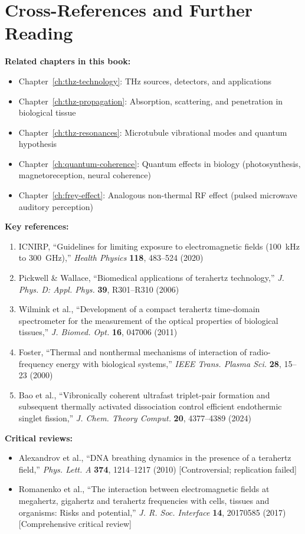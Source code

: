 \section{Cross-References and Further Reading}

\textbf{Related chapters in this book:}
\begin{itemize}
\item Chapter~\ref{ch:thz-technology}: THz sources, detectors, and applications
\item Chapter~\ref{ch:thz-propagation}: Absorption, scattering, and penetration in biological tissue
\item Chapter~\ref{ch:thz-resonances}: Microtubule vibrational modes and quantum hypothesis
\item Chapter~\ref{ch:quantum-coherence}: Quantum effects in biology (photosynthesis, magnetoreception, neural coherence)
\item Chapter~\ref{ch:frey-effect}: Analogous non-thermal RF effect (pulsed microwave auditory perception)
\end{itemize}

\textbf{Key references:}
\begin{enumerate}
\item ICNIRP, ``Guidelines for limiting exposure to electromagnetic fields (100~kHz to 300~GHz),'' \textit{Health Physics} \textbf{118}, 483--524 (2020)
\item Pickwell \& Wallace, ``Biomedical applications of terahertz technology,'' \textit{J. Phys. D: Appl. Phys.} \textbf{39}, R301--R310 (2006)
\item Wilmink et al., ``Development of a compact terahertz time-domain spectrometer for the measurement of the optical properties of biological tissues,'' \textit{J. Biomed. Opt.} \textbf{16}, 047006 (2011)
\item Foster, ``Thermal and nonthermal mechanisms of interaction of radio-frequency energy with biological systems,'' \textit{IEEE Trans. Plasma Sci.} \textbf{28}, 15--23 (2000)
\item Bao et al., ``Vibronically coherent ultrafast triplet-pair formation and subsequent thermally activated dissociation control efficient endothermic singlet fission,'' \textit{J. Chem. Theory Comput.} \textbf{20}, 4377--4389 (2024)
\end{enumerate}

\textbf{Critical reviews:}
\begin{itemize}
\item Alexandrov et al., ``DNA breathing dynamics in the presence of a terahertz field,'' \textit{Phys. Lett. A} \textbf{374}, 1214--1217 (2010) [Controversial; replication failed]
\item Romanenko et al., ``The interaction between electromagnetic fields at megahertz, gigahertz and terahertz frequencies with cells, tissues and organisms: Risks and potential,'' \textit{J. R. Soc. Interface} \textbf{14}, 20170585 (2017) [Comprehensive critical review]
\end{itemize}
